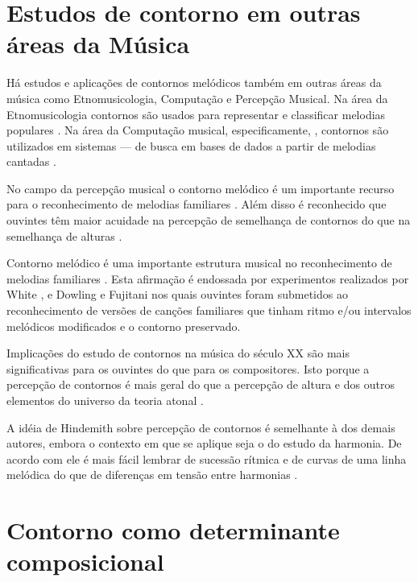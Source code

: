 \section{Estudos de contorno em outras áreas da Música}
\label{sec:estudos-de-contorno}

Há estudos e aplicações de contornos melódicos também em outras áreas
da música como Etnomusicologia, Computação e Percepção Musical. Na
área da Etnomusicologia contornos são usados para representar e
classificar melodias populares \cite{adams76:melodic}. Na área da
Computação musical, especificamente, , contornos são utilizados em sistemas  --- de busca em bases de dados a partir de melodias
cantadas \cite{ghias.ea95:query}.

No campo da percepção musical o contorno melódico é um importante
recurso para o reconhecimento de melodias familiares \cite[p.
136]{dowling.ea86:music}. Além disso é reconhecido que ouvintes têm
maior acuidade na percepção de semelhança de contornos do que na
semelhança de alturas \cite[p. 226]{marvin.ea87:relating}.

Contorno melódico é uma importante estrutura musical no reconhecimento
de melodias familiares \cite[p. 136]{dowling.ea86:music}. Esta
afirmação é endossada por experimentos realizados por White
\cite{white60:recognition}, e Dowling e Fujitani
\cite{dowling.ea71:contour} nos quais ouvintes foram submetidos ao
reconhecimento de versões de canções familiares que tinham ritmo e/ou
intervalos melódicos modificados e o contorno preservado.

Implicações do estudo de contornos na música do século XX são mais
significativas para os ouvintes do que para os compositores. Isto
porque a percepção de contornos é mais geral do que a percepção de
altura e dos outros elementos do universo da teoria atonal
\cite[p. 224]{friedmann85:methodology}.

A idéia de Hindemith sobre percepção de contornos é semelhante à dos
demais autores, embora o contexto em que se aplique seja o do estudo
da harmonia. De acordo com ele é mais fácil lembrar de sucessão
rítmica e de curvas de uma linha melódica do que de diferenças em
tensão entre harmonias \cite[p. 175]{hindemith41:craft}.

\section{Contorno como determinante composicional}
\label{sec:cont-como-determ}

